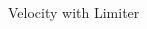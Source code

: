 \documentclass[8pt,xcolor=svgnames]{beamer}
\begin{document}
\begin{frame}
\begin{columns}
\begin{column}{0.3\textwidth}
\begin{figure}[t]
\begin{center}
\\Velocity with Limiter
\end{center}
\end{figure}
\end{column}
\end{columns}
\end{frame}

\end{document}
